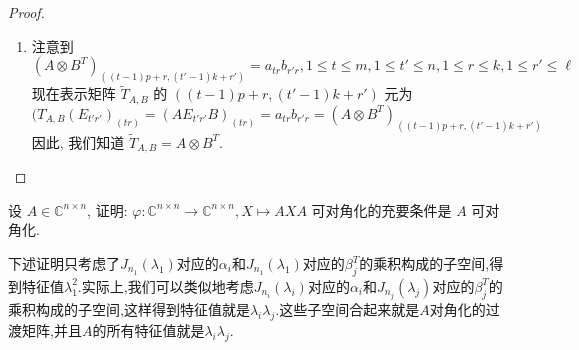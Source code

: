 \documentclass[../../main.tex]{subfiles}
\begin{document}
\begin{proof}
\begin{enumerate}
\item 注意到
$$(A \otimes B^T)_{((t - 1)p + r, (t' - 1)k + r')} = a_{tr} b_{r'r}, 1 \leqslant  t \leqslant  m, 1 \leqslant  t' \leqslant  n, 1 \leqslant  r \leqslant  k, 1 \leqslant  r' \leqslant  \ell$$
现在表示矩阵 $\widetilde{T}_{A,B}$ 的 $((t - 1)p + r, (t' - 1)k + r')$ 元为
$$(T_{A,B}(E_{t'r'})_{(tr)} = (AE_{t'r'}B)_{(tr)} = a_{tr} b_{r'r} = (A \otimes B^T)_{((t - 1)p + r, (t' - 1)k + r')}$$
因此, 我们知道 $\widetilde{T}_{A,B} = A \otimes B^T$.
\end{enumerate}

\end{proof}

\begin{example}
设 $A \in \mathbb{C}^{n \times n}$, 证明: $\varphi : \mathbb{C}^{n \times n} \to \mathbb{C}^{n \times n}, X \mapsto AXA$ 可对角化的充要条件是 $A$ 可对角化.
\end{example}
\begin{note}
下述证明只考虑了$J_{n_1}(\lambda_1)$对应的$\alpha_i$和$J_{n_1}(\lambda_1)$对应的$\beta_j^T$的乘积构成的子空间,得到特征值$\lambda_1^2$.实际上,我们可以类似地考虑$J_{n_i}(\lambda_i)$对应的$\alpha_i$和$J_{n_j}(\lambda_j)$对应的$\beta_j^T$的乘积构成的子空间,这样得到特征值就是$\lambda_i\lambda_j$.这些子空间合起来就是$A$对角化的过渡矩阵,并且$A$的所有特征值就是$\lambda_i\lambda_j$.
\end{note}
\end{document}
